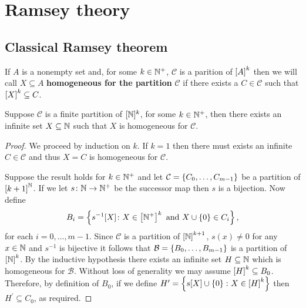 
\chapter{Ramsey theory}


\section{Classical Ramsey theorem}


\begin{dfn}
   If $A$ is a nonempty set and, for some $k\in\posnats$, $\mathcal{C}$ is a
   parition of $\subsets{k}{A}$ then we will call $X\subseteq A$
   \textbf{homogeneous for the partition} $\mathcal{C}$ if there exists a $C\in
   \mathcal{C}$ such that $\subsets{k}{X}\subseteq C$.
\end{dfn}

\begin{thm}
	Suppose $\mathcal{C}$ is a finite partition of $[\nats]^k$, for some
	$k\in\posnats$, then there exists an infinite set $X\subseteq\nats$ such
	that $X$ is homogeneous for $\mathcal{C}$.
\end{thm}
\begin{proof}
	We proceed by induction on $k$. If $k=1$ then there must exists an infinite
	$C\in\mathcal{C}$ and thus $X=C$ is homogeneous for $\mathcal{C}$.

	Suppose the result holds for $k\in\posnats$ and let
	$\mathcal{C}=\set{C_0,\dotsc,C_{m-1}}$ be a partition of
	$\subsets{\nats}{k+1}$.  If we let $s\colon\nats\to\posnats$
	be the successor map then $s$ is a bijection.  Now define
	\begin{equation}
		B_i=\setbuild{s^{-1}[X]}{X\in\subsets{k}{\posnats}\text{ and }X\cup\set{0}\in C_i},
	\end{equation}
	for each $i=0,\dotsc,m-1$.  Since $\mathcal{C}$ is a partition of $\subsets{k+1}{\nats}$, $s(x)\neq 0$ for any $x\in\nats$ and $s^{-1}$ is bijective it follows that $\mathcal{B}=\set{B_0,\dotsc,B_{m-1}}$ is a partition of $\subsets{k}{\nats}$.  By the inductive hypothesis there exists an infinite set $H\subseteq\nats$ which is homogeneous for $\mathcal{B}$.  Without loss of generality we may assume $\subsets{k}{H}\subseteq B_0$.  Therefore, by definition of $B_0$, if we define $H^\prime=\setbuild{s[X]\cup\set{0}}{X\in\subsets{k}{H}}$ then $H^\prime\subseteq C_0$, as required.
\end{proof}

